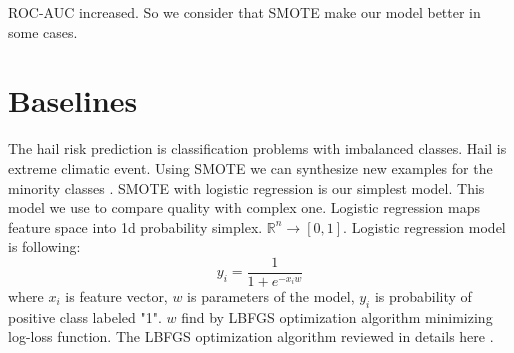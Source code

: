 \documentclass{article}
\begin{document}
\begin{figure}[h]
\begin{minipage}[h]{0.49\linewidth}
\end{minipage}
\hfill
\begin{minipage}[h]{0.49\linewidth}
\end{minipage}
\end{figure}

ROC-AUC increased. So we consider that SMOTE make our model better in some cases.

\section{Baselines}
The hail risk prediction is classification problems with imbalanced classes. Hail is extreme climatic event. Using SMOTE we can synthesize new examples for the minority classes \cite{DBLP:journals/corr/abs-1106-1813}. SMOTE with logistic regression is our simplest model. This model we use to compare quality with complex one. Logistic regression maps feature space into 1d probability simplex. $\mathbb{R}^n \rightarrow [0,1]$. Logistic regression model is following:
\begin{equation}
    y_i = \frac{1}{1 + e^{-x_iw}}
\end{equation}
where $x_i$ is feature vector, $w$ is parameters of the model, $y_i$ is probability of positive class labeled "1". $w$ find by LBFGS optimization algorithm minimizing log-loss function. The LBFGS optimization algorithm reviewed in details here \cite{mokhtari2014global}.
    




\end{document}
